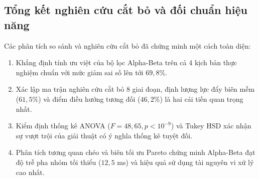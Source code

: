 \subsection{Tổng kết nghiên cứu cắt bỏ và đối chuẩn hiệu năng}

\hspace{0.5cm} Các phân tích so sánh và nghiên cứu cắt bỏ đã chứng minh một cách toàn diện:
\begin{enumerate}
    \item Khẳng định tính ưu việt của bộ lọc Alpha-Beta trên cả 4 kịch bản thực nghiệm chuẩn với mức giảm sai số lên tới $69{,}8\%$.
    \item Xác lập ma trận nghiên cứu cắt bỏ 8 giai đoạn, định lượng lực đẩy biên mềm ($61{,}5\%$) và điểm điều hướng tương đối ($46{,}2\%$) là hai cải tiến quan trọng nhất.
    \item Kiểm định thống kê ANOVA ($F = 48{,}65, p < 10^{-9}$) và Tukey HSD xác nhận sự vượt trội của giải thuật có ý nghĩa thống kê tuyệt đối.
    \item Phân tích tương quan chéo và biên tối ưu Pareto chứng minh Alpha-Beta đạt độ trễ pha nhóm tối thiểu ($12{,}5$ ms) và hiệu quả sử dụng tài nguyên vi xử lý cao nhất.
\end{enumerate}
